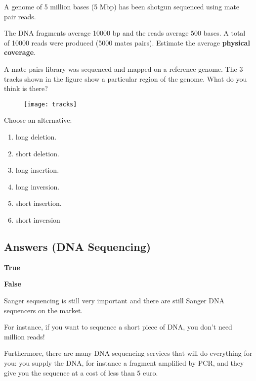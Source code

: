 \begin{Exercise} [
  title={Physical coverage},
  difficulty={1},
  label={ex18},
  origin={G. Valle}
 ]

  \Question A genome of 5 million bases (5 Mbp) has been shotgun sequenced
using mate pair reads.

The DNA fragments average 10000 bp and the reads average 500 bases.
A total of 10000 reads were produced (5000 mates pairs). Estimate the average
\textbf{physical coverage}.

\end{Exercise}

\begin{Exercise} [
  title={Mate pairs},
  difficulty={1},
  label={ex19},
  origin={G. Valle}
 ]

A mate pairs library was sequenced and mapped on a reference genome.
The 3 tracks shown in the figure show a particular region of the genome.
What do you think is there?

 \begin{figure}[H]
  \centering
  \texttt{[image: tracks]}
 \end{figure}

Choose an alternative:

\begin{enumerate}
  \item long deletion.
  \item short deletion.
  \item long insertion.
  \item long inversion.
  \item short insertion.
  \item short inversion
\end{enumerate}

\end{Exercise}

\subsection{Answers (DNA Sequencing)}

\begin{Answer} [
   ref={ex14},
   number={14}
 ]

  \Question \textbf{True}

\end{Answer}

\begin{Answer} [
   ref={ex15},
   number={15}
 ]

  \Question \textbf{False}

Sanger sequencing is still very important and there are still Sanger DNA
sequencers on the market.

For instance, if you want to sequence a short piece of DNA, you don't need
million reads!

Furthermore, there are many DNA sequencing services that will do everything
for you: you supply the DNA, for instance a fragment amplified by PCR, and
they give you the sequence at a cost of less than 5 euro.

\end{Answer}

